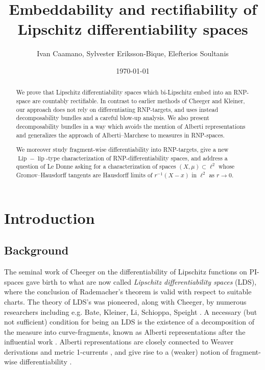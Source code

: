 \documentclass{amsart}
\title[Embeddability and rectifiability of LDS]{Embeddability and rectifiability of Lipschitz differentiability spaces}
\author{Ivan Caamano, Sylvester Eriksson-Bique, Elefterios Soultanis}
\date{\today}
\numberwithin{equation}{section}
\newcommand{\lip}{\operatorname{lip}}
\newcommand{\Lip}{\operatorname{Lip}}
\newcommand{\inv}{^{-1}}
\begin{document}
\maketitle

\begin{abstract}
We prove that Lipschitz differentiability spaces which bi-Lipschitz embed into an RNP-space are countably rectifiable. In contrast to earlier methods of Cheeger and Kleiner, our approach does not rely on differentiating RNP-targets, and uses instead decomposability bundles and a careful blow-up analysis. We also present decomposability bundles in a way which avoids the mention of Alberti representations and generalizes the approach of Alberti--Marchese \cite{almar16} to measures in RNP-spaces. 

We moreover study fragment-wise differentiability into RNP-targets, give a new $\Lip-\lip$-type characterization of RNP-differentiability spaces, and address a question of Le Donne asking for a characterization of spaces $(X,\mu)\subset\ell^2$ whose Gromov--Hausdorff tangents are Hausdorff limits of $r\inv (X-x)$ in $\ell^2$ as $r\to 0$.


\end{abstract}

\section{Introduction}

\subsection{Background}
The seminal work of Cheeger \cite{che99} on the differentiability of Lipschitz functions on PI-spaces gave birth to what are now called \emph{Lipschitz differentiability spaces} (LDS), where the conclusion of Rademacher's theorem is valid with respect to suitable charts. The theory of LDS's was pioneered, along with Cheeger, by numerous researchers including e.g. Bate, Kleiner, Li, Schioppa, Speight \cite{bate12diff,bate2013differentiability,bate17,sch16b,sch16a,che-kle-sch16}. A necessary (but not sufficient) condition for being an LDS is the existence of a decomposition of the measure into curve-fragments, known as Alberti representations after the influential work \cite{almar16}. Alberti representations are closely connected to Weaver derivations and metric 1-currents \cite{sch16,sch16b}, and give rise to a (weaker) notion of fragment-wise differentiability \cite{tsd24}.
\end{document}
